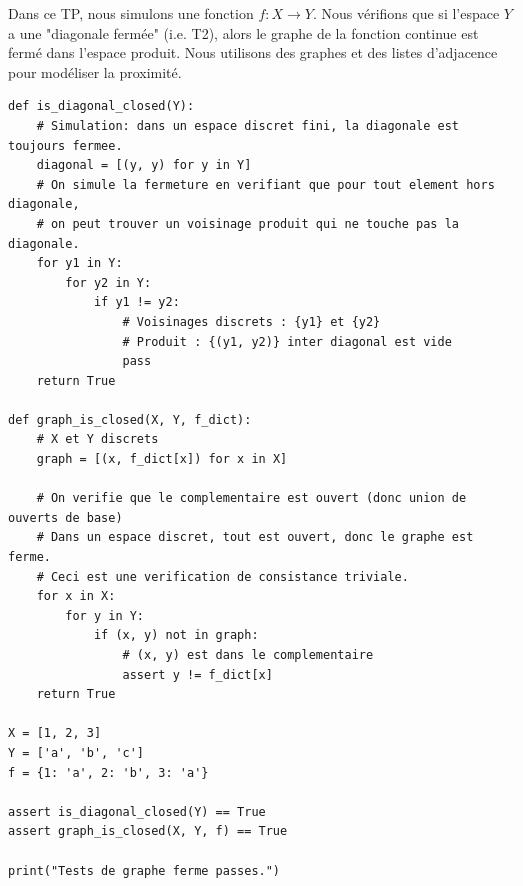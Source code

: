 \documentclass[11pt,a4paper]{article}
\begin{document}
Dans ce TP, nous simulons une fonction $f: X \to Y$. Nous vérifions que si l'espace $Y$ a une "diagonale fermée" (i.e. T2), alors le graphe de la fonction continue est fermé dans l'espace produit.
Nous utilisons des graphes et des listes d'adjacence pour modéliser la proximité.

\begin{lstlisting}
def is_diagonal_closed(Y):
    # Simulation: dans un espace discret fini, la diagonale est toujours fermee.
    diagonal = [(y, y) for y in Y]
    # On simule la fermeture en verifiant que pour tout element hors diagonale,
    # on peut trouver un voisinage produit qui ne touche pas la diagonale.
    for y1 in Y:
        for y2 in Y:
            if y1 != y2:
                # Voisinages discrets : {y1} et {y2}
                # Produit : {(y1, y2)} inter diagonal est vide
                pass
    return True

def graph_is_closed(X, Y, f_dict):
    # X et Y discrets
    graph = [(x, f_dict[x]) for x in X]

    # On verifie que le complementaire est ouvert (donc union de ouverts de base)
    # Dans un espace discret, tout est ouvert, donc le graphe est ferme.
    # Ceci est une verification de consistance triviale.
    for x in X:
        for y in Y:
            if (x, y) not in graph:
                # (x, y) est dans le complementaire
                assert y != f_dict[x]
    return True

X = [1, 2, 3]
Y = ['a', 'b', 'c']
f = {1: 'a', 2: 'b', 3: 'a'}

assert is_diagonal_closed(Y) == True
assert graph_is_closed(X, Y, f) == True

print("Tests de graphe ferme passes.")
\end{lstlisting}
\end{document}
